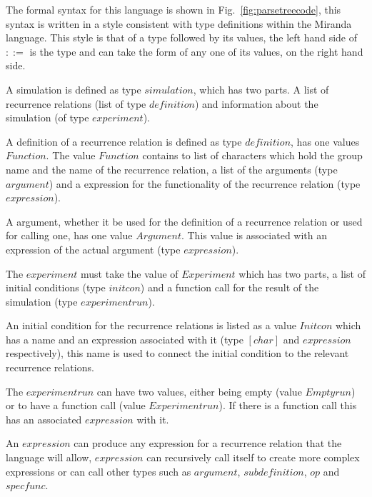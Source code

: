 \documentclass{article}
\begin{document}

The formal syntax for this language is shown in Fig.~\ref{fig:parsetreecode}, this syntax is written in a style consistent with type definitions within the Miranda language. This style is that of a type followed by its values, the left hand side of $::=$ is the type and can take the form of any one of its values, on the right hand side. 

A simulation is defined as type $simulation$, which has two parts. A list of recurrence relations (list of type $definition$) and information about the simulation (of type $experiment$). 

A definition of a recurrence relation is defined as type $definition$, has one values $Function$. The value $Function$ contains to list of characters which hold the group name and the name of the recurrence relation, a list of the arguments (type $argument$) and a expression for the functionality of the recurrence relation (type $expression$). 

A argument, whether it be used for the definition of a recurrence relation or used for calling one, has one value $Argument$. This value is associated with an expression of the actual argument (type $expression$). 

The $experiment$ must take the value of $Experiment$ which has two parts, a list of initial conditions (type $initcon$) and a function call for the result of the simulation (type $experimentrun$). 

An initial condition for the recurrence relations is listed as a value $Initcon$ which has a name and an expression associated with it (type $[char]$ and $expression$ respectively), this name is used to connect the initial condition to the relevant recurrence relations. 

The $experimentrun$ can have two values, either being empty (value $Emptyrun$) or to have a function call (value $Experimentrun$). If there is a function call this has an associated $expression$ with it. 

An $expression$ can produce any expression for a recurrence relation that the language will allow, $expression$ can recursively call itself to create more complex expressions or  can call other types such as $argument$, $subdefinition$, $op$ and $specfunc$.    
\end{document}
